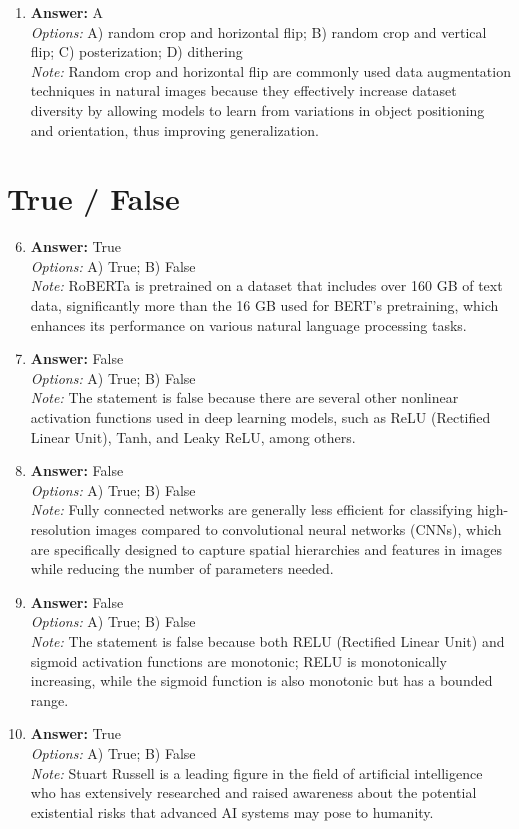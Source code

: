 \documentclass[12pt]{article}
\begin{document}
\begin{enumerate}[label=\arabic*.]
\item \textbf{Answer:} A
\\ \textit{Options:} A) random crop and horizontal flip; B) random crop and vertical flip; C) posterization; D) dithering
\\ \textit{Note:} Random crop and horizontal flip are commonly used data augmentation techniques in natural images because they effectively increase dataset diversity by allowing models to learn from variations in object positioning and orientation, thus improving generalization.
\end{enumerate}

\section*{True / False}
\begin{enumerate}[label=\arabic*.]
\setcounter{enumi}{5}
\item \textbf{Answer:} True
\\ \textit{Options:} A) True; B) False
\\ \textit{Note:} RoBERTa is pretrained on a dataset that includes over 160 GB of text data, significantly more than the 16 GB used for BERT's pretraining, which enhances its performance on various natural language processing tasks.
\item \textbf{Answer:} False
\\ \textit{Options:} A) True; B) False
\\ \textit{Note:} The statement is false because there are several other nonlinear activation functions used in deep learning models, such as ReLU (Rectified Linear Unit), Tanh, and Leaky ReLU, among others.
\item \textbf{Answer:} False
\\ \textit{Options:} A) True; B) False
\\ \textit{Note:} Fully connected networks are generally less efficient for classifying high-resolution images compared to convolutional neural networks (CNNs), which are specifically designed to capture spatial hierarchies and features in images while reducing the number of parameters needed.
\item \textbf{Answer:} False
\\ \textit{Options:} A) True; B) False
\\ \textit{Note:} The statement is false because both RELU (Rectified Linear Unit) and sigmoid activation functions are monotonic; RELU is monotonically increasing, while the sigmoid function is also monotonic but has a bounded range.
\item \textbf{Answer:} True
\\ \textit{Options:} A) True; B) False
\\ \textit{Note:} Stuart Russell is a leading figure in the field of artificial intelligence who has extensively researched and raised awareness about the potential existential risks that advanced AI systems may pose to humanity.
\end{enumerate}
\end{document}
